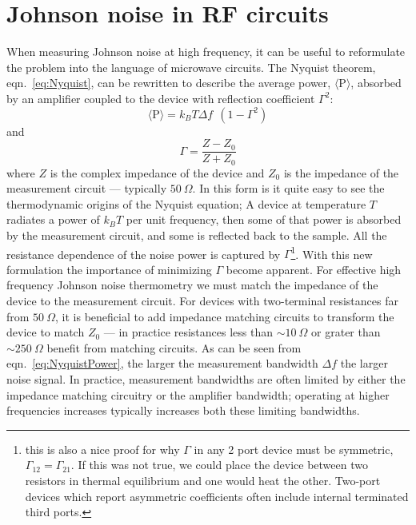 \section{Johnson noise in RF circuits}
When measuring Johnson noise at high frequency, it can be useful to reformulate the problem into the language of microwave circuits. The Nyquist theorem, eqn.~\ref{eq:Nyquist}, can be rewritten to describe the average power, $\langle\mathrm{P}\rangle$, absorbed by an amplifier coupled to the device with reflection coefficient $\Gamma^2$:
\begin{equation}\label{eq:NyquistPower}
\langle\mathrm{P}\rangle = k_BT\Delta f~~(1-\Gamma^2)
\end{equation}
and
\begin{equation}\label{eq:Gamma}
\Gamma = \frac{Z-Z_0}{Z+Z_0}
\end{equation}
where $Z$ is the complex impedance of the device and $Z_0$ is the impedance of the measurement circuit --- typically $50~\Omega$. In this form is it quite easy to see the thermodynamic origins of the Nyquist equation; A device at temperature $T$ radiates a power of $k_BT$ per unit frequency, then some of that power is absorbed by the measurement circuit, and some is reflected back to the sample. All the resistance dependence of the noise power is captured by $\Gamma$\footnote{this is also a nice proof for why $\Gamma$ in any 2 port device must be symmetric, $\Gamma_{12}=\Gamma_{21}$. If this was not true, we could place the device between two resistors in thermal equilibrium and one would heat the other. Two-port devices which report asymmetric coefficients often include internal terminated third ports.}.
With this new formulation the importance of minimizing $\Gamma$ become apparent. For effective high frequency Johnson noise thermometry we must match the impedance of the device to the measurement circuit. For devices with two-terminal resistances far from $50~\Omega$, it is beneficial to add impedance matching circuits to transform the device to match $Z_0$ --- in practice resistances less than $\sim 10~\Omega$ or grater than $\sim 250~\Omega$ benefit from matching circuits.
As can be seen from eqn.~\ref{eq:NyquistPower}, the larger the measurement bandwidth $\Delta f$ the larger noise signal. In practice, measurement bandwidths are often limited by either the impedance matching circuitry or the amplifier bandwidth; operating at higher frequencies increases typically increases both these limiting bandwidths.


